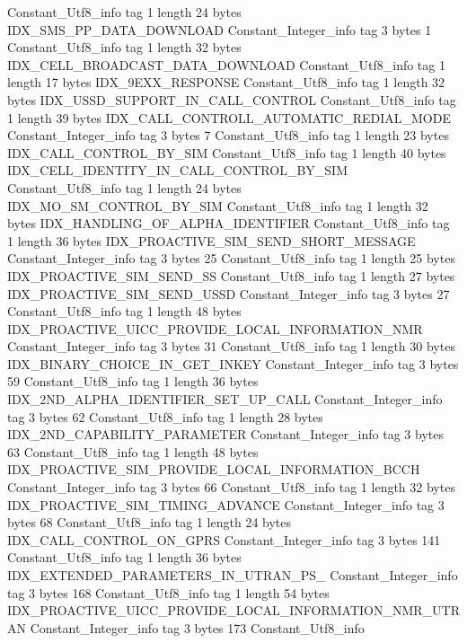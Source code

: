 {{{		}
		Constant_Utf8_info {
			tag	1
			length	24
			bytes	IDX_SMS_PP_DATA_DOWNLOAD
		}
		Constant_Integer_info {
			tag	3
			bytes	1
		}
		Constant_Utf8_info {
			tag	1
			length	32
			bytes	IDX_CELL_BROADCAST_DATA_DOWNLOAD
		}
		Constant_Utf8_info {
			tag	1
			length	17
			bytes	IDX_9EXX_RESPONSE
		}
		Constant_Utf8_info {
			tag	1
			length	32
			bytes	IDX_USSD_SUPPORT_IN_CALL_CONTROL
		}
		Constant_Utf8_info {
			tag	1
			length	39
			bytes	IDX_CALL_CONTROLL_AUTOMATIC_REDIAL_MODE
		}
		Constant_Integer_info {
			tag	3
			bytes	7
		}
		Constant_Utf8_info {
			tag	1
			length	23
			bytes	IDX_CALL_CONTROL_BY_SIM
		}
		Constant_Utf8_info {
			tag	1
			length	40
			bytes	IDX_CELL_IDENTITY_IN_CALL_CONTROL_BY_SIM
		}
		Constant_Utf8_info {
			tag	1
			length	24
			bytes	IDX_MO_SM_CONTROL_BY_SIM
		}
		Constant_Utf8_info {
			tag	1
			length	32
			bytes	IDX_HANDLING_OF_ALPHA_IDENTIFIER
		}
		Constant_Utf8_info {
			tag	1
			length	36
			bytes	IDX_PROACTIVE_SIM_SEND_SHORT_MESSAGE
		}
		Constant_Integer_info {
			tag	3
			bytes	25
		}
		Constant_Utf8_info {
			tag	1
			length	25
			bytes	IDX_PROACTIVE_SIM_SEND_SS
		}
		Constant_Utf8_info {
			tag	1
			length	27
			bytes	IDX_PROACTIVE_SIM_SEND_USSD
		}
		Constant_Integer_info {
			tag	3
			bytes	27
		}
		Constant_Utf8_info {
			tag	1
			length	48
			bytes	IDX_PROACTIVE_UICC_PROVIDE_LOCAL_INFORMATION_NMR
		}
		Constant_Integer_info {
			tag	3
			bytes	31
		}
		Constant_Utf8_info {
			tag	1
			length	30
			bytes	IDX_BINARY_CHOICE_IN_GET_INKEY
		}
		Constant_Integer_info {
			tag	3
			bytes	59
		}
		Constant_Utf8_info {
			tag	1
			length	36
			bytes	IDX_2ND_ALPHA_IDENTIFIER_SET_UP_CALL
		}
		Constant_Integer_info {
			tag	3
			bytes	62
		}
		Constant_Utf8_info {
			tag	1
			length	28
			bytes	IDX_2ND_CAPABILITY_PARAMETER
		}
		Constant_Integer_info {
			tag	3
			bytes	63
		}
		Constant_Utf8_info {
			tag	1
			length	48
			bytes	IDX_PROACTIVE_SIM_PROVIDE_LOCAL_INFORMATION_BCCH
		}
		Constant_Integer_info {
			tag	3
			bytes	66
		}
		Constant_Utf8_info {
			tag	1
			length	32
			bytes	IDX_PROACTIVE_SIM_TIMING_ADVANCE
		}
		Constant_Integer_info {
			tag	3
			bytes	68
		}
		Constant_Utf8_info {
			tag	1
			length	24
			bytes	IDX_CALL_CONTROL_ON_GPRS
		}
		Constant_Integer_info {
			tag	3
			bytes	141
		}
		Constant_Utf8_info {
			tag	1
			length	36
			bytes	IDX_EXTENDED_PARAMETERS_IN_UTRAN_PS_
		}
		Constant_Integer_info {
			tag	3
			bytes	168
		}
		Constant_Utf8_info {
			tag	1
			length	54
			bytes	IDX_PROACTIVE_UICC_PROVIDE_LOCAL_INFORMATION_NMR_UTRAN
		}
		Constant_Integer_info {
			tag	3
			bytes	173
		}
		Constant_Utf8_info {
}}}
